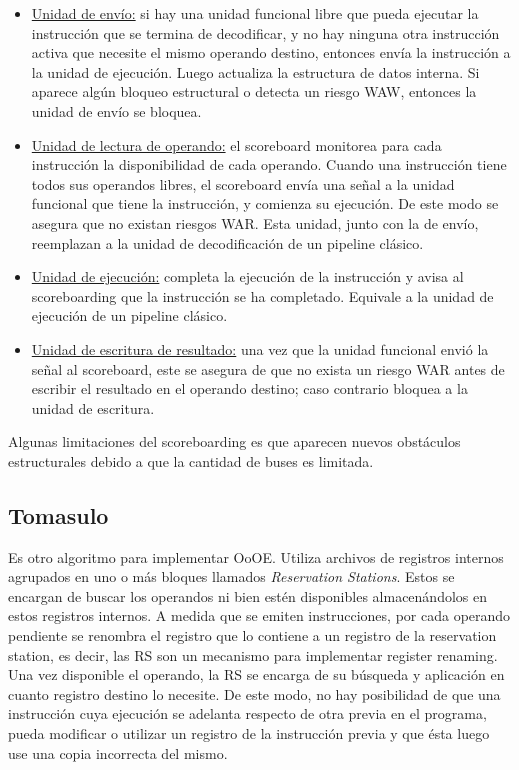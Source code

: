 \begin{itemize}
 \item \underline{Unidad de env\'io:} si hay una unidad funcional libre que pueda ejecutar la instrucci\'on que se termina de decodificar, 
 y no hay ninguna otra instrucci\'on activa que necesite el mismo operando destino, entonces env\'ia la instrucci\'on a la unidad de ejecuci\'on.
 Luego actualiza la estructura de datos interna. Si aparece alg\'un bloqueo estructural o detecta un riesgo WAW, entonces la unidad de env\'io se bloquea.
 
 \item \underline{Unidad de lectura de operando:} el scoreboard monitorea para cada instrucci\'on la disponibilidad de cada operando. Cuando una instrucci\'on
 tiene todos sus operandos libres, el scoreboard env\'ia una se\~nal a la unidad funcional que tiene la instrucci\'on, y comienza su ejecuci\'on. De este modo 
 se asegura que no existan riesgos WAR. Esta unidad, junto con la de env\'io, reemplazan a la unidad de decodificaci\'on de un pipeline cl\'asico.
 
 \item \underline{Unidad de ejecuci\'on:} completa la ejecuci\'on de la instrucci\'on y avisa al scoreboarding que la instrucci\'on se ha completado.
 Equivale a la unidad de ejecuci\'on de un pipeline cl\'asico.
 
 \item \underline{Unidad de escritura de resultado:} una vez que la unidad funcional envi\'o la se\~nal al scoreboard, este se asegura de que no exista
 un riesgo WAR antes de escribir el resultado en el operando destino; caso contrario bloquea a la unidad de escritura.
\end{itemize}

Algunas limitaciones del scoreboarding es que aparecen nuevos obst\'aculos estructurales debido a que la cantidad de buses es limitada.


\subsection{Tomasulo}

Es otro algoritmo para implementar OoOE. Utiliza archivos de registros internos agrupados en uno o m\'as bloques llamados \textit{Reservation Stations}.
Estos se encargan de buscar los operandos ni bien est\'en disponibles almacen\'andolos en estos registros internos. A medida que se emiten instrucciones,
por cada operando pendiente se renombra el registro que lo contiene a un registro de la reservation station, es decir, las RS son un mecanismo
para implementar register renaming. Una vez disponible el operando, la RS se encarga de su b\'usqueda y aplicaci\'on en cuanto registro destino lo
necesite. De este modo, no hay posibilidad de que una instrucci\'on cuya ejecuci\'on se adelanta respecto de otra previa en el programa, pueda modificar
o utilizar un registro de la instrucci\'on previa y que \'esta luego use una copia incorrecta del mismo.

